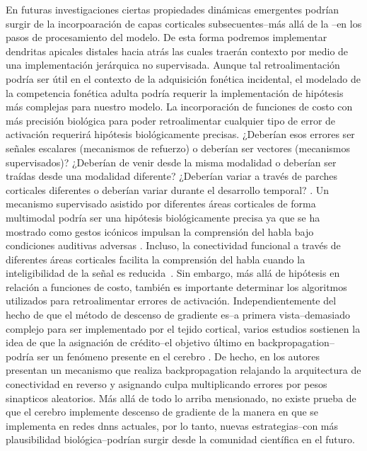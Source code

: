 {En futuras investigaciones ciertas propiedades dinámicas emergentes podrían surgir de la incorpoaración de capas corticales subsecuentes--más allá de la --en los pasos de procesamiento del modelo. De esta forma podremos implementar dendritas apicales distales hacia atrás las cuales traerán contexto por medio de una implementación jerárquica no supervisada.
Aunque tal retroalimentación podría ser útil en el contexto de la adquisición fonética incidental, el modelado de la competencia fonética adulta podría requerir la implementación de hipótesis más complejas para nuestro modelo. La incorporación de funciones de costo con más precisión biológica para poder retroalimentar cualquier tipo de error de activación requerirá hipótesis biológicamente precisas. ¿Deberían esos errores ser señales escalares (mecanismos de refuerzo) o deberían ser vectores (mecanismos supervisados)? ¿Deberían de venir desde la misma modalidad o deberían ser traídas desde una modalidad diferente? ¿Deberían variar a través de parches corticales diferentes o deberían variar durante el desarrollo temporal? \cite{10.3389/fncom.2016.00094}.
Un mecanismo supervisado asistido por diferentes áreas corticales de forma multimodal podría ser una hipótesis biológicamente precisa ya que se ha mostrado como gestos icónicos impulsan la comprensión del habla bajo condiciones auditivas adversas \cite{HOLLE2010875}.
Incluso, la conectividad funcional a través de diferentes áreas corticales facilita la comprensión del habla cuando la inteligibilidad de la señal es reducida~\cite{Obleser2283}. Sin embargo, más allá de hipótesis en relación a funciones de costo, también es importante determinar los algoritmos utilizados para retroalimentar errores de activación. Independientemente del hecho de que el método de descenso de gradiente es--a primera vista--demasiado complejo para ser implementado por el tejido cortical, varios estudios sostienen la idea de que la asignación de crédito--el objetivo último en backpropagation--podría ser un fenómeno presente en el cerebro \cite{Guerguiev2017TowardsDL}. De hecho, en \cite{Lillicrap_2016} los autores presentan un mecanismo que realiza backpropagation relajando la arquitectura de conectividad en reverso y asignando culpa multiplicando errores por pesos sinapticos aleatorios.
Más allá de todo lo arriba mensionado, no existe prueba de que el cerebro implemente descenso de gradiente de la manera en que se implementa en redes \glspl{dnn} actuales, por lo tanto, nuevas estrategias--con más plausibilidad biológica--podrían surgir desde la comunidad científica en el futuro.

}
